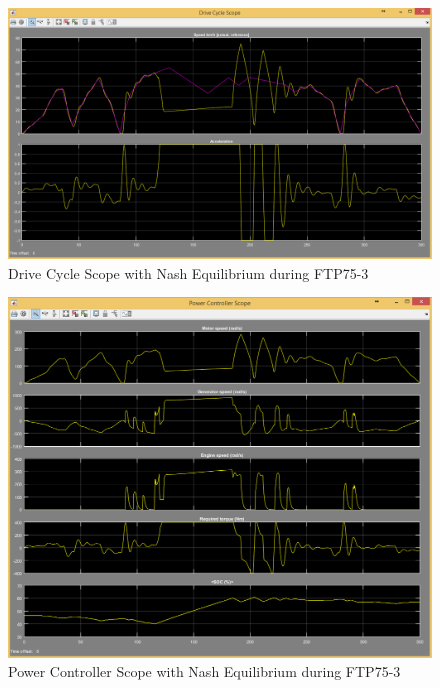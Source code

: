 \begin{figure}[h]
\centering
\includegraphics[scale=0.4]{figures/NashEquilibrium/FTP75-3/driveCycle15Juni}
\caption{Drive Cycle Scope with Nash Equilibrium during FTP75-3}
\label{fig:dcne3}
\end{figure}

\begin{figure}[h]
\centering
\includegraphics[scale=0.4]{figures/NashEquilibrium/FTP75-3/powerController15Juni}
\caption{Power Controller Scope with Nash Equilibrium during FTP75-3}
\label{fig:pcne3}
\end{figure}

